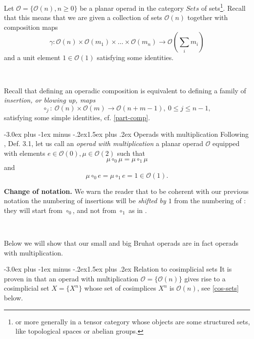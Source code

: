 \documentclass[12pt,a4paper]{article}
\makeatletter
\renewcommand{\subsection}{\@startsection{subsection}{2}{0pt}%
{-3.0ex plus -1ex minus -.2ex}{-1.5ex plus .2ex}%
{\normalfont\large\bf}}
\renewcommand{\subsection}{\@startsection{subsection}{2}{0pt}%
{-3.0ex plus -1ex minus -.2ex}{1.5ex plus .2ex}%
{\normalfont\large\bf}}
\renewcommand{\subsection}{\@startsection{subsection}{2}{0pt}%
{-3.0ex plus -1ex minus -.2ex}{-1.5ex plus .2ex}%
{\normalfont\normalsize\bf}}
\renewcommand{\subsection}{\@startsection{subsection}{2}{0pt}%
{-3.0ex plus -1ex minus -.2ex}{1.5ex plus .2ex}%
{\normalfont\normalsize\bf}}
\makeatother
\begin{document}
Let $\mathcal{O} = \{\mathcal{O}(n), n\geq 0\}$ be a planar operad in the category $Sets$ of 
sets\footnote{or more generally in a tensor category whose objects are some structured sets, like topological spaces or abelian groups.}. Recall that this means that we are given a collection of 
sets $\mathcal{O}(n)$ together with composition maps
\[
\gamma: \mathcal{O}(n)\times \mathcal{O}(m_1)\times\ldots\times \mathcal{O}(m_n)\to 
\mathcal{O}(\sum_i m_i)
\]
and a unit element $1\in\mathcal{O}(1)$ satisfying some identities. 

\


Recall that defining an operadic composition is equivalent to defining a family of {\em insertion, or blowing up, maps}
\begin{equation}\label{ins}
\circ_j:\ \mathcal{O}(n)\times\mathcal{O}(m)\to \mathcal{O}(n+m-1),\ 0\leq j\leq n - 1,
\end{equation}
satisfying some simple identities, cf. \ref{part-comp}. 

\subsection{Operads with multiplication} Following \cite{MS}, Def. 3.1, let us call an {\em operad with multiplication} a 
planar operad $\mathcal{O}$ equipped with  elements 
$e\in \mathcal{O}(0), \mu\in \mathcal{O}(2)$ such that  
\[
\mu\circ_0\mu = \mu\circ_1\mu 
\]
and 
\[
\mu\circ_0 e = \mu\circ_1 e = 1\in \mathcal{O}(1).
\]

{\bf Change of notation.} 
We warn the reader that to be coherent with our previous notation the numbering of insertions will be {\it shifted by $1$} from 
the numbering of \cite{MS}:  they will start from $\circ_0$, and 
not from $\circ_1$ as in \cite{MS}.

\

Below we will show that our small and big Bruhat operads are in fact operads with multiplication. 

\subsection{Relation to cosimplicial sets} It is proven in \cite{MS} that an operad with multiplication $\mathcal{O} = \{\mathcal{O}(n)\}$ 
gives rise to a cosimplicial set $X  = \{ X^n\}$ whose set of cosimplices $X^n$ is 
$\mathcal{O}(n)$, see \ref{cos-sets} below.
\end{document}
